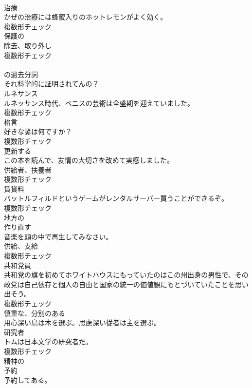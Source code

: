 \documentclass[8pt]{extreport}
\begin{document}
\begin{CJK}{UTF8}{min}
\\	[名詞]	治療	
\\	かぜの治療には蜂蜜入りのホットレモンがよく効く。	
\\	複数形チェック
\\	[形容詞]	保護の	
\\	[名詞]	除去、取り外し	
\\	複数形チェック
\\	[形容詞]	
\\	の過去分詞	
\\	それ科学的に証明されてんの？	
\\	[名詞]	ルネサンス	
\\	ルネッサンス時代、ベニスの芸術は全盛期を迎えていました。	
\\	複数形チェック
\\	[名詞]	格言	
\\	好きな諺は何ですか？	
\\	複数形チェック
\\	[動詞]	更新する	
\\	この本を読んで、友情の大切さを改めて実感しました。	
\\	[名詞]	供給者、扶養者	
\\	複数形チェック
\\	[名詞]	賃貸料	
\\	バットルフィルドというゲームがレンタルサーバー買うことができるぞ。	
\\	複数形チェック
\\	[形容詞]	地方の	
\\	[動詞]	作り直す	
\\	音楽を頭の中で再生してみなさい。	
\\	[名詞]	供給、支給	
\\	複数形チェック
\\	[名詞]	共和党員	
\\	共和党の旗を初めてホワイトハウスにもっていたのはこの州出身の男性で、その政党は自己依存と個人の自由と国家の統一の価値観にもとづいていたことを思い出そう。	
\\	複数形チェック
\\	[形容詞]	慎重な、分別のある	
\\	用心深い鳥は木を選ぶ。思慮深い従者は主を選ぶ。	
\\	[名詞]	研究者	
\\	トムは日本文学の研究者だ。	
\\	複数形チェック
\\	[形容詞]	精神の	
\\	[名詞]	予約	
\\	予約してある。	

\end{CJK}
\end{document}
